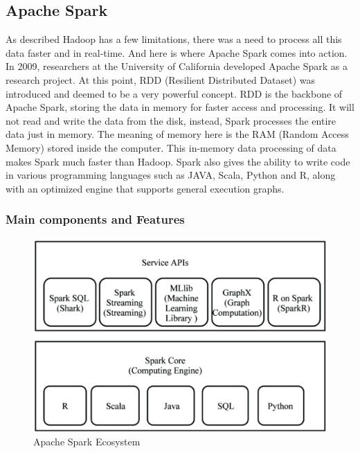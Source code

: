 \subsection{Apache Spark}
As described Hadoop has a few limitations, there was a need to process all this data faster and in real-time. And here is where Apache Spark comes into action. In 2009, researchers at the University of California developed Apache Spark as a research project. At this point, RDD (Resilient Distributed Dataset) was introduced and deemed to be a very powerful concept.\cite{apache-spark}
RDD is the backbone of Apache Spark, storing the data in memory for faster access and processing. It will not read and write the data from the disk, instead, Spark processes the entire data just in memory. The meaning of memory here is the RAM (Random Access Memory) stored inside the computer. This in-memory data processing of data makes Spark much faster than Hadoop. 
Spark also gives the ability to write code in various programming languages such as JAVA, Scala, Python and R, along with an optimized engine that supports general execution graphs.

\subsubsection{Main components and Features}

\begin{figure}[ht]
    \centering
    \includegraphics[width=1\linewidth]{images/Spark_Eco.png}
    \caption{Apache Spark Ecosystem}
    \label{fig:spark-eco}
\end{figure}

